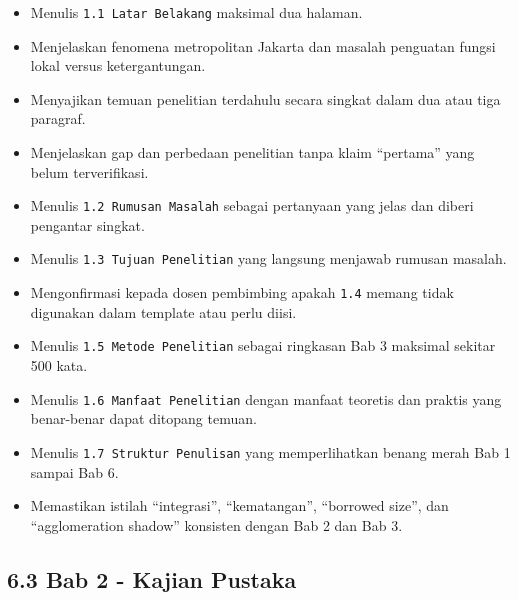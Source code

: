 \documentclass[
  indonesian,
  11pt,
]{article}
\providecommand{\tightlist}{%
  \setlength{\itemsep}{0pt}\setlength{\parskip}{0pt}}
\renewcommand{\tightlist}{%
  \setlength{\itemsep}{0.22em}%
  \setlength{\parskip}{0pt}%
}
\begin{document}
\begin{itemize}
\tightlist
\item[$\square$]
  Menulis \texttt{1.1\ Latar\ Belakang} maksimal dua halaman.
\item[$\square$]
  Menjelaskan fenomena metropolitan Jakarta dan masalah penguatan fungsi
  lokal versus ketergantungan.
\item[$\square$]
  Menyajikan temuan penelitian terdahulu secara singkat dalam dua atau
  tiga paragraf.
\item[$\square$]
  Menjelaskan gap dan perbedaan penelitian tanpa klaim ``pertama'' yang
  belum terverifikasi.
\item[$\square$]
  Menulis \texttt{1.2\ Rumusan\ Masalah} sebagai pertanyaan yang jelas
  dan diberi pengantar singkat.
\item[$\square$]
  Menulis \texttt{1.3\ Tujuan\ Penelitian} yang langsung menjawab
  rumusan masalah.
\item[$\square$]
  Mengonfirmasi kepada dosen pembimbing apakah \texttt{1.4} memang tidak
  digunakan dalam template atau perlu diisi.
\item[$\square$]
  Menulis \texttt{1.5\ Metode\ Penelitian} sebagai ringkasan Bab 3
  maksimal sekitar 500 kata.
\item[$\square$]
  Menulis \texttt{1.6\ Manfaat\ Penelitian} dengan manfaat teoretis dan
  praktis yang benar-benar dapat ditopang temuan.
\item[$\square$]
  Menulis \texttt{1.7\ Struktur\ Penulisan} yang memperlihatkan benang
  merah Bab 1 sampai Bab 6.
\item[$\square$]
  Memastikan istilah ``integrasi'', ``kematangan'', ``borrowed size'',
  dan ``agglomeration shadow'' konsisten dengan Bab 2 dan Bab 3.
\end{itemize}

\subsection{6.3 Bab 2 - Kajian Pustaka}\label{bab-2---kajian-pustaka}
\end{document}
